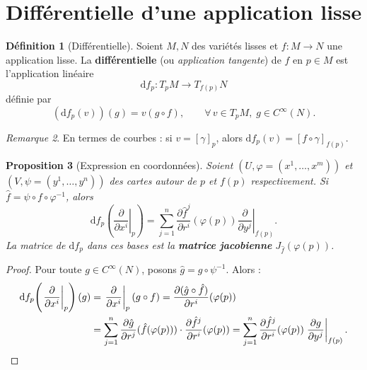 \documentclass[12pt,a4paper,openany]{book}
\theoremstyle{definition}
\newtheorem{definition}{Définition}[chapter]
\theoremstyle{plain}
\newtheorem{proposition}[definition]{Proposition}
\theoremstyle{remark}
\newtheorem{remarque}[definition]{Remarque}
\newcommand{\dd}{\mathrm{d}}
\begin{document}
\section{Différentielle d'une application lisse}\label{sec:differentielle}

\begin{definition}[Différentielle]\label{def:differentielle}
Soient $M, N$ des variétés lisses et $f : M \to N$ une application lisse.
La \textbf{différentielle} (ou \emph{application tangente})
de $f$ en $p \in M$ est l'application linéaire
\[
  \dd f_p : T_pM \longrightarrow T_{f(p)}N
\]
définie par
\[
  (\dd f_p(v))(g) = v(g \circ f), \qquad \forall\, v \in T_pM,\; g \in C^\infty(N).
\]
\end{definition}

\begin{remarque}\label{rem:diff-courbe}
En termes de courbes : si $v = [\gamma]_p$, alors
$\dd f_p(v) = [f \circ \gamma]_{f(p)}$.
\end{remarque}

\begin{proposition}[Expression en coordonnées]\label{prop:diff-coordonnees}
Soient $(U, \varphi = (x^1, \ldots, x^m))$ et $(V, \psi = (y^1, \ldots, y^n))$
des cartes autour de $p$ et $f(p)$ respectivement. Si $\hat{f} = \psi \circ f \circ \varphi^{-1}$,
alors
\[
  \dd f_p\!\left(\left.\frac{\partial}{\partial x^i}\right|_p\right)
  = \sum_{j=1}^n \frac{\partial \hat{f}^j}{\partial r^i}(\varphi(p))
    \left.\frac{\partial}{\partial y^j}\right|_{f(p)}.
\]
La matrice de $\dd f_p$ dans ces bases est la \textbf{matrice jacobienne}
$J_{\hat{f}}(\varphi(p))$.
\end{proposition}

\begin{proof}
Pour toute $g \in C^\infty(N)$, posons $\hat{g} = g \circ \psi^{-1}$. Alors :
\begin{align*}
  \dd f_p\!\left(\left.\frac{\partial}{\partial x^i}\right|_p\right)(g)
  &= \left.\frac{\partial}{\partial x^i}\right|_p(g \circ f)
   = \frac{\partial(\hat{g} \circ \hat{f})}{\partial r^i}(\varphi(p)) \\
  &= \sum_{j=1}^n \frac{\partial \hat{g}}{\partial r^j}(\hat{f}(\varphi(p)))
     \cdot \frac{\partial \hat{f}^j}{\partial r^i}(\varphi(p))
   = \sum_{j=1}^n \frac{\partial \hat{f}^j}{\partial r^i}(\varphi(p))
     \left.\frac{\partial g}{\partial y^j}\right|_{f(p)}. \qedhere
\end{align*}
\end{proof}
\end{document}
